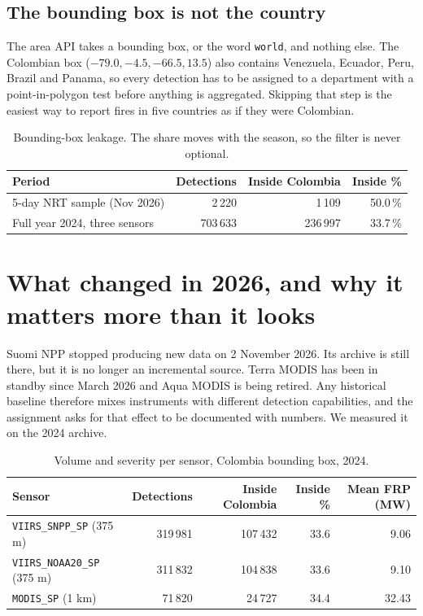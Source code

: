 \documentclass[11pt,a4paper]{article}
\newcommand{\code}[1]{\texttt{\small #1}}
\begin{document}
\subsection{The bounding box is not the country}

The area API takes a bounding box, or the word \code{world}, and nothing else. The Colombian box
($-79.0, -4.5, -66.5, 13.5$) also contains Venezuela, Ecuador, Peru, Brazil and Panama, so every
detection has to be assigned to a department with a point-in-polygon test before anything is
aggregated. Skipping that step is the easiest way to report fires in five countries as if they were
Colombian.

\begin{table}[h]
\centering
\small
\begin{tabular}{lrrr}
\toprule
\textbf{Period} & \textbf{Detections} & \textbf{Inside Colombia} & \textbf{Inside \%} \\
\midrule
5-day NRT sample (Nov 2026) & 2\,220 & 1\,109 & 50.0\,\% \\
Full year 2024, three sensors & 703\,633 & 236\,997 & 33.7\,\% \\
\bottomrule
\end{tabular}
\caption{Bounding-box leakage. The share moves with the season, so the filter is never optional.}
\end{table}

\section{What changed in 2026, and why it matters more than it looks}

Suomi NPP stopped producing new data on 2 November 2026. Its archive is still there, but it is no
longer an incremental source. Terra MODIS has been in standby since March 2026 and Aqua MODIS is being
retired. Any historical baseline therefore mixes instruments with different detection capabilities,
and the assignment asks for that effect to be documented with numbers. We measured it on the
2024 archive.

\begin{table}[h]
\centering
\small
\begin{tabular}{lrrrr}
\toprule
\textbf{Sensor} & \textbf{Detections} & \textbf{Inside Colombia} & \textbf{Inside \%} & \textbf{Mean FRP (MW)} \\
\midrule
\code{VIIRS\_SNPP\_SP} (375 m) & 319\,981 & 107\,432 & 33.6 & 9.06 \\
\code{VIIRS\_NOAA20\_SP} (375 m) & 311\,832 & 104\,838 & 33.6 & 9.10 \\
\code{MODIS\_SP} (1 km) & 71\,820 & 24\,727 & 34.4 & 32.43 \\
\bottomrule
\end{tabular}
\caption{Volume and severity per sensor, Colombia bounding box, 2024.}
\end{table}
\end{document}
